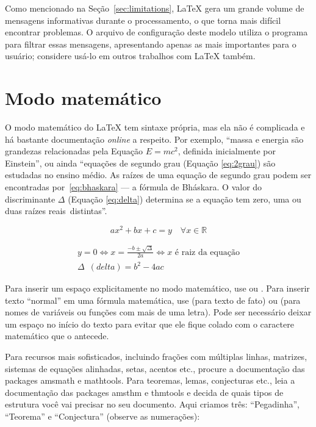\enlargethispage{\baselineskip}

Como mencionado na Seção~\ref{sec:limitations}, \LaTeX{} gera um grande
volume de mensagens informativas durante o processamento, o que torna mais
difícil encontrar problemas. O arquivo de configuração  deste
modelo utiliza o programa  para filtrar essas mensagens,
apresentando apenas as mais importantes para o usuário; considere usá-lo
em outros trabalhos com \LaTeX{} também.


\section{Modo matemático}

O modo matemático do \LaTeX{} tem sintaxe própria, mas ela não é complicada e
há bastante documentação \emph{online} a respeito. Por exemplo, ``massa e
energia são grandezas relacionadas pela Equação $E=mc^2$, definida inicialmente
por Einstein'', ou ainda ``equações de segundo grau (Equação \ref{eq:2grau})
são estudadas no ensino médio. As raízes de uma equação de segundo grau podem
ser encontradas por~\eqref{eq:bhaskara} --- a fórmula de Bháskara.
O valor do discriminante $\Delta$ (Equação \ref{eq:delta}) determina se a
equação tem zero, uma ou duas raízes reais~distintas''.

\begin{equation}
  \label{eq:2grau}
  ax^2+bx+c=y \quad \forall x \in \mathbb{R}
\end{equation}

\begin{gather}
  \label{eq:bhaskara}
    y=0 \Leftrightarrow x=\frac{-b \pm \sqrt{\Delta}}{2a}
    \Leftrightarrow x \text{ é raiz da equação}\\
  \label{eq:delta}
    \Delta\enspace(\mathit{delta}) = b^2-4ac
\end{gather}

Para inserir um espaço explicitamente no modo matemático, use
 ou . Para inserir texto ``normal'' em
uma fórmula matemática, use  (para texto de fato)
ou  (para nomes de variáveis ou funções com
mais de uma letra). Pode ser necessário deixar um espaço no início do
texto para evitar que ele fique colado com o caractere matemático que
o antecede.

Para recursos mais sofisticados, incluindo frações com múltiplas linhas,
matrizes, sistemas de equações alinhadas, setas, acentos etc., procure
a documentação das packages \textsf{amsmath} e \textsf{mathtools}. Para
teoremas, lemas, conjecturas etc., leia a documentação das packages
\textsf{amsthm} e \textsf{thmtools} e decida de quais tipos de estrutura
você vai precisar no seu documento. Aqui criamos três: ``Pegadinha'',
``Teorema'' e ``Conjectura'' (observe as numerações):

